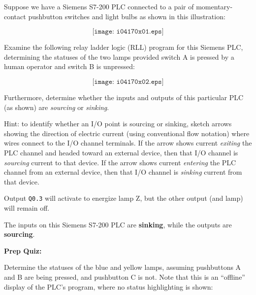 

Suppose we have a Siemens S7-200 PLC connected to a pair of momentary-contact pushbutton switches and light bulbs as shown in this illustration:

$$\texttt{[image: i04170x01.eps]}$$

Examine the following relay ladder logic (RLL) program for this Siemens PLC, determining the statuses of the two lamps provided switch A is pressed by a human operator and switch B is unpressed:

$$\texttt{[image: i04170x02.eps]}$$

Furthermore, determine whether the inputs and outputs of this particular PLC (as shown) are {\it sourcing} or {\it sinking}.







Hint: to identify whether an I/O point is sourcing or sinking, sketch arrows showing the direction of electric current (using conventional flow notation) where wires connect to the I/O channel terminals.  If the arrow shows current {\it exiting} the PLC channel and headed toward an external device, then that I/O channel is {\it sourcing} current to that device.  If the arrow shows current {\it entering} the PLC channel from an external device, then that I/O channel is {\it sinking} current from that device.







Output {\tt Q0.3} will activate to energize lamp Z, but the other output (and lamp) will remain off. 

\vskip 10pt

The inputs on this Siemens S7-200 PLC are {\bf sinking}, while the outputs are {\bf sourcing}.




\vfil \eject

\noindent
{\bf Prep Quiz:}

Determine the statuses of the blue and yellow lamps, assuming pushbuttons A and B are being pressed, and pushbutton C is not.  Note that this is an ``offline'' display of the PLC's program, where no status highlighting is shown:

